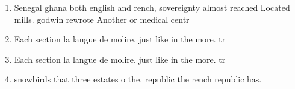 \documentclass[a4paper]{article}
\begin{document}
\begin{enumerate}
\item Senegal ghana both english and rench, sovereignty almost reached Located mills. godwin rewrote Another or medical centr

\item Each section la langue de molire. just like in the more. tr

\item Each section la langue de molire. just like in the more. tr

\item snowbirds that three estates o the. republic the rench republic has. 

\end{enumerate}
\end{document}
